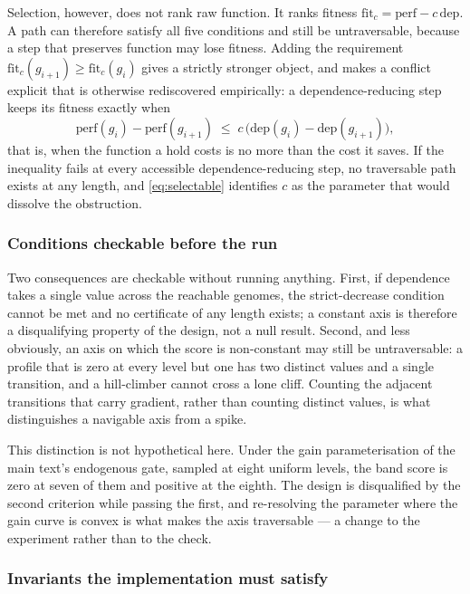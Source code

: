 \documentclass[man,12pt,floatsintext,donotrepeattitle]{apa7}
\begin{document}
Selection, however, does not rank raw function. It ranks fitness
$\mathrm{fit}_c = \mathrm{perf} - c\,\mathrm{dep}$. A path can therefore satisfy
all five conditions and still be untraversable, because a step that preserves
function may lose fitness. Adding the requirement
$\mathrm{fit}_c(g_{i+1}) \ge \mathrm{fit}_c(g_i)$ gives a strictly stronger object,
and makes a conflict explicit that is otherwise rediscovered empirically: a
dependence-reducing step keeps its fitness exactly when
\begin{equation}
\mathrm{perf}(g_i) - \mathrm{perf}(g_{i+1}) \;\le\;
  c\,\bigl(\mathrm{dep}(g_i) - \mathrm{dep}(g_{i+1})\bigr),
\label{eq:selectable}
\end{equation}
that is, when the function a hold costs is no more than the cost it saves. If the
inequality fails at every accessible dependence-reducing step, no traversable path
exists at any length, and \eqref{eq:selectable} identifies $c$ as the parameter that
would dissolve the obstruction.

\subsubsection*{Conditions checkable before the run}

Two consequences are checkable without running anything. First, if dependence takes
a single value across the reachable genomes, the strict-decrease condition cannot be
met and no certificate of any length exists; a constant axis is therefore a
disqualifying property of the design, not a null result. Second, and less obviously,
an axis on which the score is non-constant may still be untraversable: a profile that
is zero at every level but one has two distinct values and a single transition, and a
hill-climber cannot cross a lone cliff. Counting the adjacent transitions that carry
gradient, rather than counting distinct values, is what distinguishes a navigable axis
from a spike.

This distinction is not hypothetical here. Under the gain parameterisation of the main text's
endogenous gate, sampled at eight uniform levels, the band score is zero
at seven of them and positive at the eighth. The design is disqualified by the second
criterion while passing the first, and re-resolving the parameter where the gain curve
is convex is what makes the axis traversable --- a change to the experiment rather
than to the check.

\subsubsection*{Invariants the implementation must satisfy}
\end{document}
